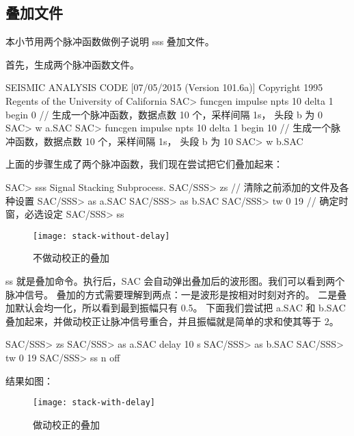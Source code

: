\subsection{叠加文件}

本小节用两个脉冲函数做例子说明 sss 叠加文件。

首先，生成两个脉冲函数文件。

\begin{SACCode}
SEISMIC ANALYSIS CODE [07/05/2015 (Version 101.6a)]
Copyright 1995 Regents of the University of California
SAC> funcgen impulse npts 10 delta 1 begin 0
// 生成一个脉冲函数，数据点数 10 个，采样间隔 1s， 头段 b 为 0
SAC> w a.SAC
SAC> funcgen impulse npts 10 delta 1 begin 10
// 生成一个脉冲函数，数据点数 10 个，采样间隔 1s， 头段 b 为 10
SAC> w b.SAC
\end{SACCode}

上面的步骤生成了两个脉冲函数，我们现在尝试把它们叠加起来：

\begin{SACCode}
SAC> sss
 Signal Stacking Subprocess.
SAC/SSS> zs         // 清除之前添加的文件及各种设置
SAC/SSS> as a.SAC
SAC/SSS> as b.SAC
SAC/SSS> tw 0 19    // 确定时窗，必选设定
SAC/SSS> ss
\end{SACCode}

\begin{figure}[H]
\centering
\texttt{[image: stack-without-delay]}
\caption{不做动校正的叠加}
\label{fig:filter-waveform}
\end{figure}

ss 就是叠加命令。执行后，SAC 会自动弹出叠加后的波形图。我们可以看到两个脉冲信号。
叠加的方式需要理解到两点：一是波形是按相对时刻对齐的。
二是叠加默认会均一化，所以看到最到振幅只有 0.5。
下面我们尝试把 a.SAC 和 b.SAC 叠加起来，并做动校正让脉冲信号重合，并且振幅就是简单的求和使其等于 2。

\begin{SACCode}
SAC/SSS> zs
SAC/SSS> as a.SAC delay 10 s
SAC/SSS> as b.SAC
SAC/SSS> tw 0 19
SAC/SSS> ss n off
\end{SACCode}

结果如图：

\begin{figure}[H]
\centering
\texttt{[image: stack-with-delay]}
\caption{做动校正的叠加}
\label{fig:filter-waveform}
\end{figure}

